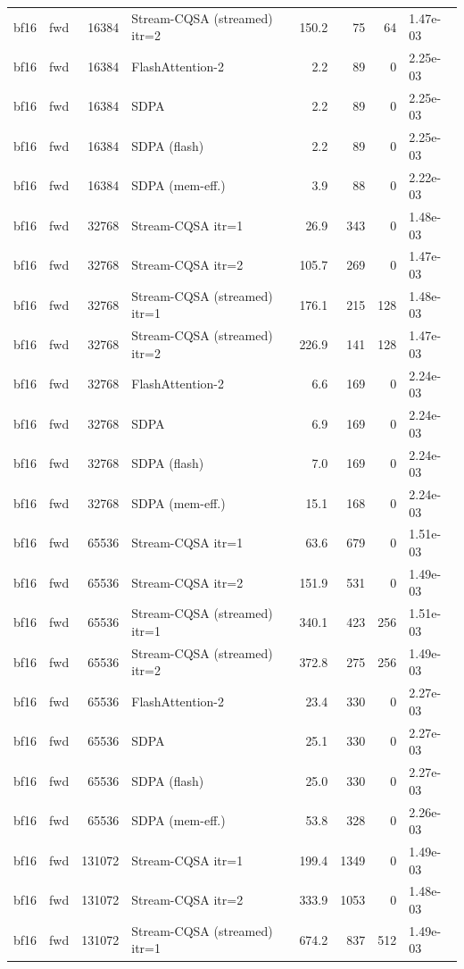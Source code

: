 \begin{tabular}{llrlrrrl}
bf16 & fwd & 16384 & Stream-CQSA (streamed) itr=2 & 150.2 & 75 & 64 & 1.47e-03 \\
bf16 & fwd & 16384 & FlashAttention-2 & 2.2 & 89 & 0 & 2.25e-03 \\
bf16 & fwd & 16384 & SDPA & 2.2 & 89 & 0 & 2.25e-03 \\
bf16 & fwd & 16384 & SDPA (flash) & 2.2 & 89 & 0 & 2.25e-03 \\
bf16 & fwd & 16384 & SDPA (mem-eff.) & 3.9 & 88 & 0 & 2.22e-03 \\
bf16 & fwd & 32768 & Stream-CQSA itr=1 & 26.9 & 343 & 0 & 1.48e-03 \\
bf16 & fwd & 32768 & Stream-CQSA itr=2 & 105.7 & 269 & 0 & 1.47e-03 \\
bf16 & fwd & 32768 & Stream-CQSA (streamed) itr=1 & 176.1 & 215 & 128 & 1.48e-03 \\
bf16 & fwd & 32768 & Stream-CQSA (streamed) itr=2 & 226.9 & 141 & 128 & 1.47e-03 \\
bf16 & fwd & 32768 & FlashAttention-2 & 6.6 & 169 & 0 & 2.24e-03 \\
bf16 & fwd & 32768 & SDPA & 6.9 & 169 & 0 & 2.24e-03 \\
bf16 & fwd & 32768 & SDPA (flash) & 7.0 & 169 & 0 & 2.24e-03 \\
bf16 & fwd & 32768 & SDPA (mem-eff.) & 15.1 & 168 & 0 & 2.24e-03 \\
bf16 & fwd & 65536 & Stream-CQSA itr=1 & 63.6 & 679 & 0 & 1.51e-03 \\
bf16 & fwd & 65536 & Stream-CQSA itr=2 & 151.9 & 531 & 0 & 1.49e-03 \\
bf16 & fwd & 65536 & Stream-CQSA (streamed) itr=1 & 340.1 & 423 & 256 & 1.51e-03 \\
bf16 & fwd & 65536 & Stream-CQSA (streamed) itr=2 & 372.8 & 275 & 256 & 1.49e-03 \\
bf16 & fwd & 65536 & FlashAttention-2 & 23.4 & 330 & 0 & 2.27e-03 \\
bf16 & fwd & 65536 & SDPA & 25.1 & 330 & 0 & 2.27e-03 \\
bf16 & fwd & 65536 & SDPA (flash) & 25.0 & 330 & 0 & 2.27e-03 \\
bf16 & fwd & 65536 & SDPA (mem-eff.) & 53.8 & 328 & 0 & 2.26e-03 \\
bf16 & fwd & 131072 & Stream-CQSA itr=1 & 199.4 & 1349 & 0 & 1.49e-03 \\
bf16 & fwd & 131072 & Stream-CQSA itr=2 & 333.9 & 1053 & 0 & 1.48e-03 \\
bf16 & fwd & 131072 & Stream-CQSA (streamed) itr=1 & 674.2 & 837 & 512 & 1.49e-03 \\

\end{tabular}
